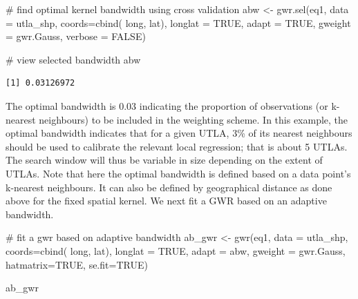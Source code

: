 \documentclass[
  letterpaper,
  DIV=11,
  numbers=noendperiod,
  oneside]{scrreprt}
\newenvironment{Shaded}{\begin{snugshade}}{\end{snugshade}}
\newcommand{\AttributeTok}[1]{\textcolor[rgb]{0.40,0.45,0.13}{#1}}
\newcommand{\CommentTok}[1]{\textcolor[rgb]{0.37,0.37,0.37}{#1}}
\newcommand{\ConstantTok}[1]{\textcolor[rgb]{0.56,0.35,0.01}{#1}}
\newcommand{\FunctionTok}[1]{\textcolor[rgb]{0.28,0.35,0.67}{#1}}
\newcommand{\NormalTok}[1]{\textcolor[rgb]{0.00,0.23,0.31}{#1}}
\newcommand{\OtherTok}[1]{\textcolor[rgb]{0.00,0.23,0.31}{#1}}
\begin{document}
\begin{Shaded}
\begin{Highlighting}[]
\CommentTok{\# find optimal kernel bandwidth using cross validation}
\NormalTok{abw }\OtherTok{\textless{}{-}} \FunctionTok{gwr.sel}\NormalTok{(eq1, }
               \AttributeTok{data =}\NormalTok{ utla\_shp, }
               \AttributeTok{coords=}\FunctionTok{cbind}\NormalTok{( long, lat),}
               \AttributeTok{longlat =} \ConstantTok{TRUE}\NormalTok{,}
               \AttributeTok{adapt =} \ConstantTok{TRUE}\NormalTok{, }
               \AttributeTok{gweight =}\NormalTok{ gwr.Gauss, }
               \AttributeTok{verbose =} \ConstantTok{FALSE}\NormalTok{)}

\CommentTok{\# view selected bandwidth}
\NormalTok{abw}
\end{Highlighting}
\end{Shaded}

\begin{verbatim}
[1] 0.03126972
\end{verbatim}

The optimal bandwidth is 0.03 indicating the proportion of observations
(or k-nearest neighbours) to be included in the weighting scheme. In
this example, the optimal bandwidth indicates that for a given UTLA, 3\%
of its nearest neighbours should be used to calibrate the relevant local
regression; that is about 5 UTLAs. The search window will thus be
variable in size depending on the extent of UTLAs. Note that here the
optimal bandwidth is defined based on a data point's k-nearest
neighbours. It can also be defined by geographical distance as done
above for the fixed spatial kernel. We next fit a GWR based on an
adaptive bandwidth.

\begin{Shaded}
\begin{Highlighting}[]
\CommentTok{\# fit a gwr based on adaptive bandwidth}
\NormalTok{ab\_gwr }\OtherTok{\textless{}{-}} \FunctionTok{gwr}\NormalTok{(eq1, }
            \AttributeTok{data =}\NormalTok{ utla\_shp,}
            \AttributeTok{coords=}\FunctionTok{cbind}\NormalTok{( long, lat),}
            \AttributeTok{longlat =} \ConstantTok{TRUE}\NormalTok{,}
            \AttributeTok{adapt =}\NormalTok{ abw, }
            \AttributeTok{gweight =}\NormalTok{ gwr.Gauss,}
            \AttributeTok{hatmatrix=}\ConstantTok{TRUE}\NormalTok{, }
            \AttributeTok{se.fit=}\ConstantTok{TRUE}\NormalTok{)}

\NormalTok{ab\_gwr}
\end{Highlighting}
\end{Shaded}
\end{document}
